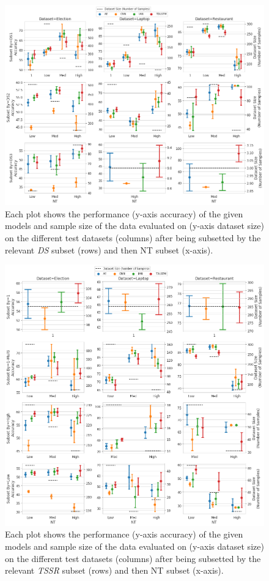 \begin{figure}[h!]
    \centering
    \includegraphics[scale=0.35]{images/augmentation/methods_performance/baseline/baseline_ds_nt_test_scores.png}
    \caption{Each plot shows the performance (y-axis accuracy) of the given models and sample size of the data evaluated on (y-axis dataset size) on the different test datasets (columns) after being subsetted by the relevant \textit{DS} subset (rows) and then NT subset (x-axis).}
    \label{fig:aug_baseline_ds_nt_test_scores}
\end{figure}
\begin{figure}[h!]
    \centering
    \includegraphics[scale=0.35]{images/augmentation/methods_performance/baseline/baseline_tssr_nt_test_scores.png}
    \caption{Each plot shows the performance (y-axis accuracy) of the given models and sample size of the data evaluated on (y-axis dataset size) on the different test datasets (columns) after being subsetted by the relevant \textit{TSSR} subset (rows) and then NT subset (x-axis).}
    \label{fig:aug_baseline_tssr_nt_test_scores}
\end{figure}

